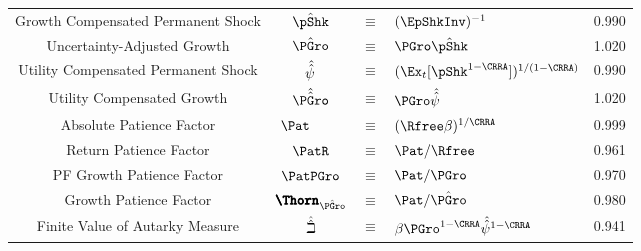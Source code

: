 \begin{table}
\begin{center}
\begin{tabular}{|c|ccl|c|}
Growth Compensated Permanent Shock            & $\InvEpShkInv $ & $\equiv$ & $ (\EpShkInv)^{-1}$               & 0.990 \\
Uncertainty-Adjusted Growth                 & $\PGroAdj $ & $\equiv$ & $ \PGro \InvEpShkInv$        & 1.020 \\
Utility Compensated Permanent Shock                & $\hat{\hat{\psi}} $ & $\equiv$ & $ (\Ex_{t}[\pShk^{1-\CRRA}])^{1/(1-\CRRA)}$ & 0.990 \\
Utility Compensated Growth                     & $\PGrouAdj $ & $\equiv$ & $ \PGro \uInvEpShkuInv$        & 1.020 \\
Absolute Patience Factor                    & $\Pat_{\phantom{\Rfree}} $ & $\equiv$ & $ (\Rfree \beta)^{1/\CRRA}$                & 0.999 \\
Return Patience Factor                      & $\PatR$ & $\equiv$ & $\Pat/\Rfree $     & 0.961 \\
PF Growth Patience Factor    & $\PatPGro$ & $\equiv$ & $\Pat/\PGro $      & 0.970 \\
Growth Patience Factor                      & $\PatPGroAdj$ & $\equiv$ & $ \Pat/\PGroAdj$& 0.980 \\
Finite Value of Autarky Measure         & $\hat{\hat{\beth}} $ & $\equiv$ & $ \beta \PGro^{1-\CRRA}\uInvEpShkuInv^{1-\CRRA}$       & 0.941 \\ \hline
\end{tabular}
\end{center}
\end{table}
